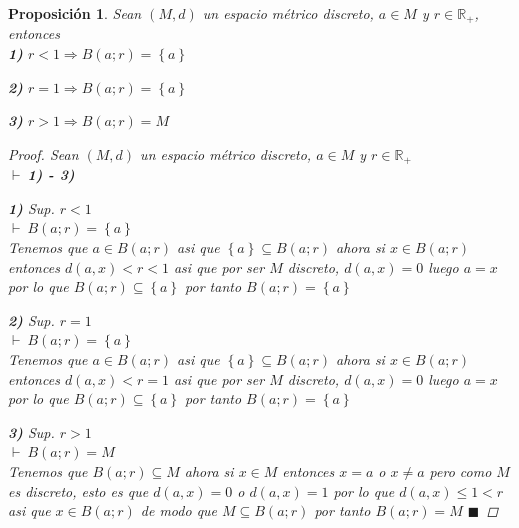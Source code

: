 \documentclass[oneside]{book} %
\theoremstyle{Teorema}
\newtheorem{Proposicion}[Definicion]{Proposición}
\theoremstyle{Ejemplos}
\theoremstyle{[Obs]}
\renewcommand{\{}{\left\lbrace} %
\renewcommand{\}}{\right\rbrace} %
\renewcommand{\sc}{\subseteq} %
\newcommand{\R}{\mathbb{R}} %
\renewcommand{\qed}{$\blacksquare$} %
\newcommand{\pd}{$\vdash\ $} %
\begin{document}
			\begin{Proposicion}\setlength{\parindent}{0em}
				
				Sean $(M, d)$ un espacio métrico discreto, $a \in M$ y $r \in \R_{+}$, entonces \\ 

				\textbf{1)} $r < 1 \Rightarrow B(a;r) = \{ a \}$

				\textbf{2)} $r = 1 \Rightarrow B(a;r) = \{ a \}$

				\textbf{3)} $r > 1 \Rightarrow B(a;r) = M$ 

				\begin{proof}
					
					Sean $(M, d)$ un espacio métrico discreto, $a \in M$ y $r \in \R_{+}$ \\
					\pd \textbf{1) - 3)}

					\textbf{1)} Sup. $r < 1$ \\ 
					\pd $B(a;r) = \{ a \}$ \\ 
					Tenemos que $a \in B(a;r)$ asi que $\{ a \} \sc B(a;r)$ ahora si $x \in B(a;r)$ entonces $d(a, x) < r < 1$ asi que por ser $M$ discreto, $d(a, x) = 0$ luego $a = x$ por lo que $B(a;r) \sc \{ a \}$ por tanto $B(a;r) = \{ a \}$

					\textbf{2)} Sup. $r = 1$ \\ 
					\pd $B(a;r) = \{ a \}$ \\ 
					Tenemos que $a \in B(a;r)$ asi que $\{ a \} \sc B(a;r)$ ahora si $x \in B(a;r)$ entonces $d(a, x) < r = 1$ asi que por ser $M$ discreto, $d(a, x) = 0$ luego $a = x$ por lo que $B(a;r) \sc \{ a \}$ por tanto $B(a;r) = \{ a \}$

					\textbf{3)} Sup. $r > 1$ \\ 
					\pd $B(a;r) = M$ \\ 
					Tenemos que $B(a;r) \sc M$ ahora si $x \in M$ entonces $x = a$ o $x \neq a$ pero como $M$ es discreto, esto es que $d(a, x) = 0$ o $d(a, x) = 1$ por lo que $d(a, x) \leq 1 < r$ asi que $x \in B(a;r)$ de modo que $M \sc B(a;r)$ por tanto $B(a;r) = M$ \qed

				\end{proof}
			
			\end{Proposicion}
\end{document}
